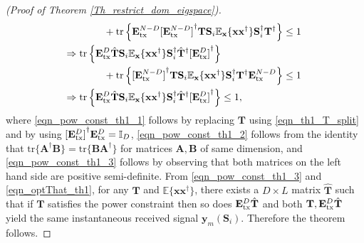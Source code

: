 \documentclass[journal,comsoc]{IEEEtran}
\begin{document}
\begin{appendices}
\begin{proof}[(Proof of Theorem \ref{Th_restrict_dom_eigspace})]
\begin{subequations}
\begin{flalign}
& \qquad \qquad + \text{tr} \left\{ \mathbf{E}_{\rm tx}^{N-D} {[\mathbf{E}_{\rm tx}^{N-D}]}^{\dag} \mathbf{T} \mathbf{S}_i \mathbb{E}_{\mathbf{x}}\{\mathbf{x} \mathbf{x}^{\dag}\} \mathbf{S}_i^{\dag} \mathbf{T}^{\dag} \right\} \leq 1 \!\!\! & \label{eqn_pow_const_th1_1}\\
& \Rightarrow \text{tr} \left\{ \mathbf{E}_{\rm tx}^D \hat{\mathbf{T}} \mathbf{S}_i \mathbb{E}_{\mathbf{x}}\{\mathbf{x} \mathbf{x}^{\dag}\} \mathbf{S}_i^{\dag} \hat{\mathbf{T}}^{\dag} {[\mathbf{E}_{\rm tx}^D]}^{\dag} \right\} & \nonumber \\
& \qquad \qquad + \text{tr} \left\{ {[\mathbf{E}_{\rm tx}^{N-D}]}^{\dag}\mathbf{T} \mathbf{S}_i \mathbb{E}_{\mathbf{x}}\{\mathbf{x} \mathbf{x}^{\dag}\} \mathbf{S}_i^{\dag} \mathbf{T}^{\dag} \mathbf{E}_{\rm tx}^{N-D} \right\} \leq 1 \!\!\! & \label{eqn_pow_const_th1_2} \\
& \Rightarrow \text{tr} \left\{ \mathbf{E}_{\rm tx}^{D} \hat{\mathbf{T}} \mathbf{S}_i \mathbb{E}_{\mathbf{x}}\{\mathbf{x} \mathbf{x}^{\dag}\} \mathbf{S}_i^{\dag} \hat{\mathbf{T}}^{\dag} {[\mathbf{E}_{\rm tx}^{D}]}^{\dag} \right\} \leq 1, & \label{eqn_pow_const_th1_3}
\end{flalign}
\end{subequations}
where \eqref{eqn_pow_const_th1_1} follows by replacing $\mathbf{T}$ using \eqref{eqn_th1_T_split} and by using ${[\mathbf{E}_{\rm tx}^D]}^{\dag} \mathbf{E}_{\rm tx}^D = \mathbb{I}_D$, \eqref{eqn_pow_const_th1_2} follows from the identity that $\text{tr}\{\mathbf{A^{\dag}B}\} = \text{tr}\{\mathbf{BA^{\dag}}\}$ for matrices $\mathbf{A,B}$ of same dimension, and \eqref{eqn_pow_const_th1_3} follows by observing that both matrices on the left hand side are positive semi-definite.
From \eqref{eqn_pow_const_th1_3} and \eqref{eqn_optThat_th1}, for any $\mathbf{T}$ and $\mathbb{E}\{\mathbf{x} \mathbf{x}^{\dag}\}$, there exists a $D\times L$ matrix $\hat{\mathbf{T}}$ such that if $\mathbf{T}$ satisfies the power constraint then so does $\mathbf{E}_{\rm tx}^D \hat{\mathbf{T}}$ and both $\mathbf{T}, \mathbf{E}_{\rm tx}^D \hat{\mathbf{T}}$ yield the same instantaneous received signal $\mathbf{y}_m(\mathbf{S}_i)$. Therefore the theorem follows. 
\end{proof}


\end{appendices}
\end{document}
